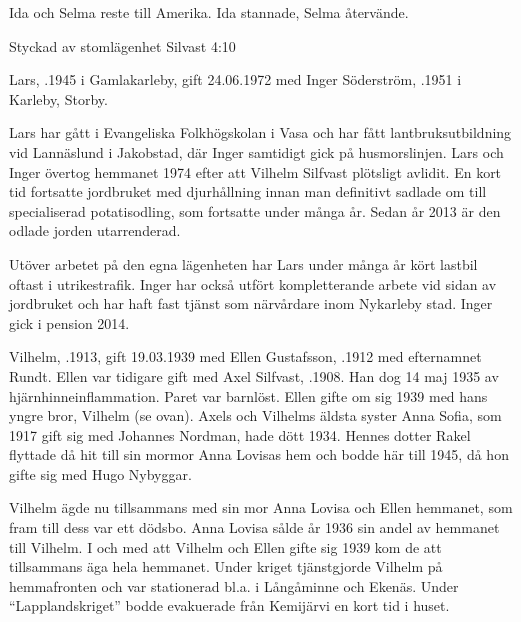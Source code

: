 Ida och Selma reste till Amerika. Ida stannade, Selma återvände.




Styckad av stomlägenhet Silvast 4:10


Lars, .1945 i Gamlakarleby, gift 24.06.1972 med Inger Söderström, .1951 i Karleby, Storby.
\begin{jhchildren}
  \item {}
  \item {}
  \item {}
\end{jhchildren}
Lars har gått i Evangeliska Folkhögskolan i Vasa och har fått lantbruksutbildning vid Lannäslund i Jakobstad, där Inger samtidigt gick på husmorslinjen. Lars och Inger övertog hemmanet 1974 efter att Vilhelm Silfvast plötsligt avlidit. En kort tid fortsatte jordbruket med djurhållning innan man definitivt sadlade om till specialiserad potatisodling, som  fortsatte under många år. Sedan år 2013  är den odlade jorden utarrenderad.

Utöver arbetet på den egna lägenheten har Lars under många år kört lastbil oftast i utrikestrafik. Inger har också utfört kompletterande arbete vid sidan av jordbruket och har haft fast tjänst som närvårdare inom Nykarleby stad. Inger gick i pension 2014.


Vilhelm, .1913, gift 19.03.1939 med Ellen Gustafsson, .1912 med efternamnet Rundt. Ellen var tidigare gift med Axel Silfvast, .1908. Han dog 14 maj 1935 av hjärnhinneinflammation. Paret var barnlöst. Ellen gifte om sig 1939 med hans yngre bror, Vilhelm (se ovan). Axels och Vilhelms äldsta syster Anna Sofia, som 1917 gift sig med Johannes Nordman, hade dött 1934. Hennes dotter Rakel flyttade då hit till sin mormor Anna Lovisas hem och bodde här till 1945, då hon gifte sig med Hugo Nybyggar.

Vilhelm ägde nu tillsammans med sin mor Anna Lovisa och Ellen hemmanet, som fram till dess var ett dödsbo. Anna Lovisa sålde år 1936 sin andel av hemmanet till Vilhelm. I och med att Vilhelm och Ellen gifte sig 1939 kom de att tillsammans äga hela hemmanet. Under kriget tjänstgjorde Vilhelm på hemmafronten och var stationerad bl.a. i Långåminne och Ekenäs. Under ``Lapplandskriget'' bodde evakuerade från Kemijärvi en kort tid i huset.

